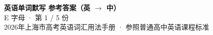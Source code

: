 \documentclass[10pt,a4paper]{article}
\begin{document}
\pagestyle{plain}

\begin{center}
{\LARGE\bfseries 英语单词默写 \quad 参考答案（英 $\to$ 中）}\\[0.22em]
{\large E 字母 · 第 1 / 5 份}\\[0.18em]
{\small 2026年上海市高考英语词汇用法手册 · 参照普通高中英语课程标准}
\end{center}

\vspace{0.2em}
\noindent{\color{rulegray}\rule{\textwidth}{0.8pt}}

\vspace{0.35em}

\vspace{0.25em}
\renewcommand{\arraystretch}{1.32}
\end{document}
